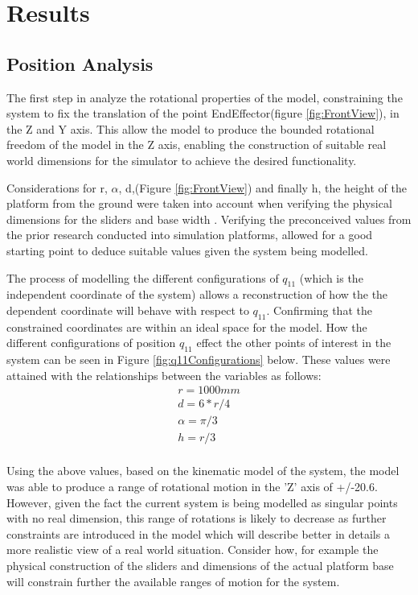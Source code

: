 \section{Results}

\subsection{Position Analysis}
The first step in analyze the rotational properties of the model, constraining the system to fix the translation of the point EndEffector(figure \ref{fig:FrontView}), in the Z and Y axis. This allow the model to produce the bounded rotational freedom of the model in the Z axis, enabling the construction of suitable real world dimensions for the simulator to achieve the desired functionality. 

Considerations for r, $\alpha$, d,(Figure \ref{fig:FrontView}) and finally h, the height of the platform from the ground were taken into account when verifying the physical dimensions for the sliders and base width . Verifying the preconceived values from the prior research conducted into simulation platforms, allowed for a good starting point to deduce suitable values given the system being modelled. 

The process of modelling the different configurations of $q_{11}$ (which is the independent coordinate of the system) allows a reconstruction of how the the dependent coordinate will behave with respect to $q_{11}$. Confirming that the constrained coordinates are within an ideal space for the model. How the different configurations of position $q_{11}$ effect the other points of interest in the  system can be seen in Figure \ref{fig:q11Configurations} below. These values were attained with the relationships between the variables as follows:
\begin{align*}
    r = 1000mm \\
    d = 6*r/4 \\
    \alpha = \pi/3 \\
    h = r/3 \\
\end{align*}

Using the above values, based on the kinematic model of the system, the model was able to produce a range of rotational motion in the 'Z' axis of +/-20.6\degree. However, given the fact the current system is being modelled as singular points with no real dimension, this range of rotations is likely to decrease as further constraints are introduced in the model which will describe better in details a more realistic view of a real world situation. Consider how, for example the physical construction of the sliders and dimensions of the actual platform base will constrain further the available ranges of motion for the system. 


